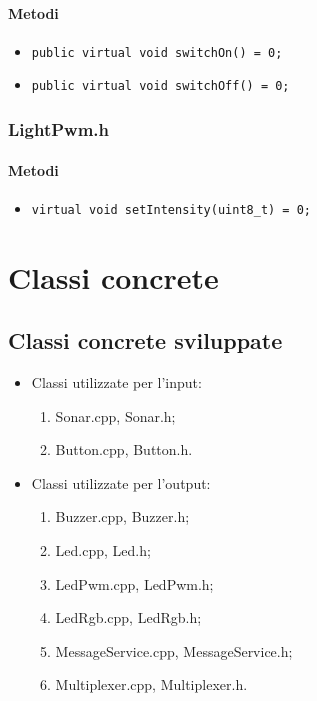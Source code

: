 \subsubsection{Metodi}
\begin{itemize}
	\item \texttt{public virtual void switchOn() = 0;}
	\item \texttt{public virtual void switchOff() = 0;}
\end{itemize}

\subsection{LightPwm.h}
\subsubsection{Metodi}
\begin{itemize}
	\item \texttt{virtual void setIntensity(uint8\_t) = 0;}
\end{itemize}

\chapter{Classi concrete}
\section{Classi concrete sviluppate}
\begin{itemize}
	\item Classi utilizzate per l'input:
	\begin{enumerate}
		\item Sonar.cpp, Sonar.h;
		\item Button.cpp, Button.h.
	\end{enumerate}
	\item Classi utilizzate per l'output:
	\begin{enumerate}
		\item Buzzer.cpp, Buzzer.h;
		\item Led.cpp, Led.h;
		\item LedPwm.cpp, LedPwm.h;
		\item LedRgb.cpp, LedRgb.h;
		\item MessageService.cpp, MessageService.h;
		\item Multiplexer.cpp, Multiplexer.h.
	\end{enumerate}
\end{itemize}

